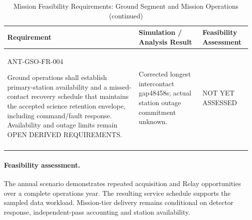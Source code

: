 \begin{table}[H]\centering\small\setlength{\tabcolsep}{3pt}
\ContinuedFloat\captionsetup{list=no}
\caption{Mission Feasibility Requirements: Ground Segment and Mission Operations (continued)}
\begin{tabular}{@{}
>{\RaggedRight\arraybackslash}p{}
>{\RaggedRight\arraybackslash}p{}
>{\RaggedRight\arraybackslash}p{}
@{}}
\toprule Requirement & Simulation / Analysis Result & Feasibility Assessment\\\midrule
{}\label{req:ANT-GSO-FR-004}\mbox{ANT-GSO-}\newline\mbox{FR-004}\par Ground operations shall establish primary-station availability and a missed-contact recovery schedule that maintains the accepted science retention envelope, including command/fault response. Availability and outage limits remain OPEN DERIVED REQUIREMENTS. & Corrected longest intercontact gap48458s; actual station outage commitment unknown. & NOT YET ASSESSED\\
\addlinespace[3pt]
\bottomrule
\end{tabular}
\end{table}
\paragraph{Feasibility assessment.} The annual scenario demonstrates repeated acquisition and Relay opportunities over a complete operations year. The resulting service schedule supports the sampled data workload. Mission-tier delivery remains conditional on detector response, independent-pass accounting and station availability.

